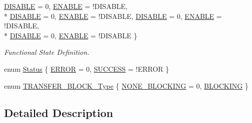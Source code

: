 \begin{DoxyCompactItemize}
\hyperlink{group___l_p_c___types___public___types_ggac9a7e9a35d2513ec15c3b537aaa4fba1ad3a9df141be0ccf10389b640f492b26d}{D\+I\+S\+A\+B\+LE} = 0, 
\hyperlink{group___l_p_c___types___public___types_ggac9a7e9a35d2513ec15c3b537aaa4fba1a7d46875fa3ebd2c34d2756950eda83bf}{E\+N\+A\+B\+LE} = !\+D\+I\+S\+A\+B\+LE, 
\\*
\hyperlink{group___l_p_c___types___public___types_ggac9a7e9a35d2513ec15c3b537aaa4fba1ad3a9df141be0ccf10389b640f492b26d}{D\+I\+S\+A\+B\+LE} = 0, 
\hyperlink{group___l_p_c___types___public___types_ggac9a7e9a35d2513ec15c3b537aaa4fba1a7d46875fa3ebd2c34d2756950eda83bf}{E\+N\+A\+B\+LE} = !\+D\+I\+S\+A\+B\+LE, 
\hyperlink{group___l_p_c___types___public___types_ggac9a7e9a35d2513ec15c3b537aaa4fba1ad3a9df141be0ccf10389b640f492b26d}{D\+I\+S\+A\+B\+LE} = 0, 
\hyperlink{group___l_p_c___types___public___types_ggac9a7e9a35d2513ec15c3b537aaa4fba1a7d46875fa3ebd2c34d2756950eda83bf}{E\+N\+A\+B\+LE} = !\+D\+I\+S\+A\+B\+LE, 
\\*
\hyperlink{group___l_p_c___types___public___types_ggac9a7e9a35d2513ec15c3b537aaa4fba1ad3a9df141be0ccf10389b640f492b26d}{D\+I\+S\+A\+B\+LE} = 0, 
\hyperlink{group___l_p_c___types___public___types_ggac9a7e9a35d2513ec15c3b537aaa4fba1a7d46875fa3ebd2c34d2756950eda83bf}{E\+N\+A\+B\+LE} = !\+D\+I\+S\+A\+B\+LE
 \}\begin{DoxyCompactList}\small\item\em Functional State Definition. \end{DoxyCompactList}
\item 
enum \hyperlink{group___l_p_c___types___public___types_ga67a0db04d321a74b7e7fcfd3f1a3f70b}{Status} \{ \hyperlink{group___l_p_c___types___public___types_gga67a0db04d321a74b7e7fcfd3f1a3f70ba2fd6f336d08340583bd620a7f5694c90}{E\+R\+R\+OR} = 0, 
\hyperlink{group___l_p_c___types___public___types_gga67a0db04d321a74b7e7fcfd3f1a3f70bac7f69f7c9e5aea9b8f54cf02870e2bf8}{S\+U\+C\+C\+E\+SS} = !\+E\+R\+R\+OR
 \}
\item 
enum \hyperlink{group___l_p_c___types___public___types_gaddb88bff95842be0c54e0e979f45cf95}{T\+R\+A\+N\+S\+F\+E\+R\+\_\+\+B\+L\+O\+C\+K\+\_\+\+Type} \{ \hyperlink{group___l_p_c___types___public___types_ggaddb88bff95842be0c54e0e979f45cf95ae00130e64382c35d172d226b79aa9acb}{N\+O\+N\+E\+\_\+\+B\+L\+O\+C\+K\+I\+NG} = 0, 
\hyperlink{group___l_p_c___types___public___types_ggaddb88bff95842be0c54e0e979f45cf95a854a1cd6e3a98db9e290dddea29725e7}{B\+L\+O\+C\+K\+I\+NG}
 \}
\end{DoxyCompactItemize}


\subsection{Detailed Description}


